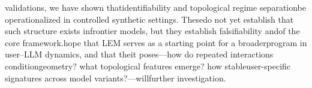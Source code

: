 \documentclass[11pt]{article}
\begin{document}
validations, we have shown that\ngeometric identifiability and topological regime separation\ncan be operationalized in controlled synthetic settings. These\nresults do not yet establish that such structure exists in\nreal frontier models, but they establish falsifiability and\noperationalizability of the core framework.\n\nWe hope that LEM serves as a starting point for a broader\nresearch program in user--LLM dynamics, and that the\nquestions it poses---how do repeated interactions condition\nlatent geometry? what topological features emerge? how stable\nare user-specific signatures across model variants?---will\nstimulate further investigation.\n\n%
\end{document}

